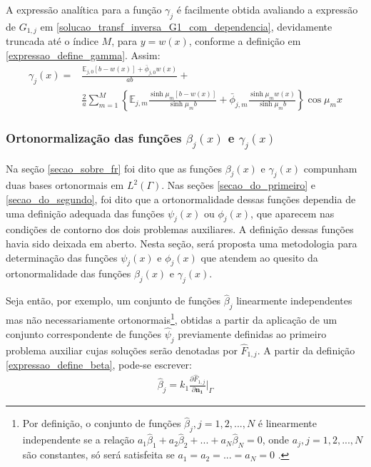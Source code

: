 A expressão analítica para a função $\gamma_j$ é facilmente obtida avaliando a expressão de $G_{1,j}$ em \eqref{solucao_transf_inversa_G1_com_dependencia}, devidamente truncada até o índice $M$, para $y = w(x)$, conforme a definição em \eqref{expressao_define_gamma}. Assim:
\begin{align}
\gamma_j(x) = & \frac{\mathbb{E}_{j,0}[b - w(x)] + \bar{\phi}_{j,0}w(x)}{ab} + \nonumber \\
&\frac{2}{a}\sum_{m=1}^M \left\lbrace\mathbb{E}_{j,m}\frac{\sinh\mu_m [b - w(x)]}{\sinh\mu_m b} + \bar{\phi}_{j, m}\frac{\sinh\mu_m w(x)}{\sinh\mu_m b}\right\rbrace \cos\mu_m x
\label{serie_para_gamma}
\end{align} 

\subsubsection{Ortonormalização das funções $\beta_j(x)$ e $\gamma_j(x)$}\label{orto_beta_gama}

Na seção \ref{secao_sobre_fr} foi dito que as funções $\beta_j(x)$ e $\gamma_j(x)$ compunham duas bases ortonormais em $L^2(\Gamma)$.
Nas seções \ref{secao_do_primeiro} e \ref{secao_do_segundo}, foi dito que a ortonormalidade dessas funções dependia de uma definição adequada das funções $\psi_j(x)$
ou $\phi_j(x)$, que aparecem nas condições de contorno dos dois problemas auxiliares. A definição dessas funções havia sido deixada em aberto. Nesta seção, será proposta uma metodologia para determinação das funções $\psi_j(x)$ e $\phi_j(x)$ que atendem ao quesito da ortonormalidade das funções $\beta_j(x)$ e $\gamma_j(x)$.

Seja então, por exemplo, um conjunto de funções $\hat{\beta}_j$ linearmente independentes mas não necessariamente ortonormais\footnote{Por definição, o conjunto de funções $\hat{\beta}_j, j = 1,2,...,N$ é linearmente independente se a relação $a_1\hat{\beta}_1 + a_2\hat{\beta}_2 + ... + a_N\hat{\beta}_N = 0$, onde $a_j, j=1,2,...,N$ são constantes, só será satisfeita se $a_1 = a_2 = ... = a_N = 0$ \citep{livro_axler}.}, obtidas a partir da aplicação de um conjunto correspondente de funções $\hat{\psi}_j$ previamente definidas ao primeiro problema auxiliar cujas soluções serão denotadas por $\hat{F}_{1,j}$. A partir da definição \eqref{expressao_define_beta}, pode-se escrever:
\begin{align}
\hat{\beta}_j = k_1 \frac{\partial \hat{F}_{1,j}}{\partial\mathbf{n_1}}\bigg|_\Gamma
\end{align}

